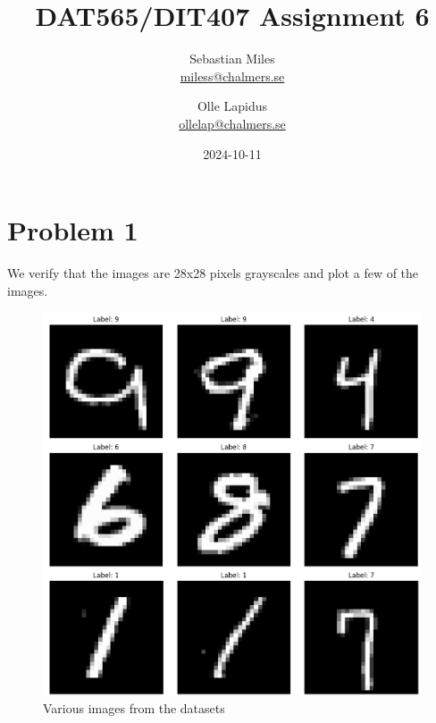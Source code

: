 \documentclass[a4paper]{article}
\begin{document}
\author{
  Sebastian Miles \\
  \href{mailto:miless@chalmers.se}{miless@chalmers.se}
  \and
  Olle Lapidus \\
  \href{mailto:ollelap@chalmers.se}{ollelap@chalmers.se}
}
\title{DAT565/DIT407 Assignment 6}
\date{2024-10-11}

\maketitle
\section*{Problem 1}
We verify that the images are 28x28 pixels grayscales and plot a few of the images.
\begin{figure}[H]
	\begin{center}
		\includegraphics[scale=0.25]{datasets.png}
		\caption{Various images from the datasets}
		\label{hist}
	\end{center}
\end{figure}
\end{document}

